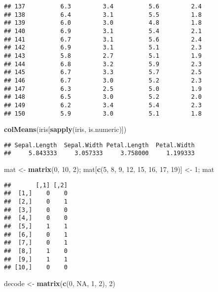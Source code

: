 \documentclass[]{article}
\newenvironment{Shaded}{\begin{snugshade}}{\end{snugshade}}
\newcommand{\DecValTok}[1]{\textcolor[rgb]{0.00,0.00,0.81}{#1}}
\newcommand{\KeywordTok}[1]{\textcolor[rgb]{0.13,0.29,0.53}{\textbf{#1}}}
\newcommand{\NormalTok}[1]{#1}
\newcommand{\OtherTok}[1]{\textcolor[rgb]{0.56,0.35,0.01}{#1}}
\newcommand{\StringTok}[1]{\textcolor[rgb]{0.31,0.60,0.02}{#1}}
\begin{document}
\begin{verbatim}
## 137          6.3         3.4          5.6         2.4
## 138          6.4         3.1          5.5         1.8
## 139          6.0         3.0          4.8         1.8
## 140          6.9         3.1          5.4         2.1
## 141          6.7         3.1          5.6         2.4
## 142          6.9         3.1          5.1         2.3
## 143          5.8         2.7          5.1         1.9
## 144          6.8         3.2          5.9         2.3
## 145          6.7         3.3          5.7         2.5
## 146          6.7         3.0          5.2         2.3
## 147          6.3         2.5          5.0         1.9
## 148          6.5         3.0          5.2         2.0
## 149          6.2         3.4          5.4         2.3
## 150          5.9         3.0          5.1         1.8
\end{verbatim}

\begin{Shaded}
\begin{Highlighting}[]
\KeywordTok{colMeans}\NormalTok{(iris[}\KeywordTok{sapply}\NormalTok{(iris, is.numeric)])}
\end{Highlighting}
\end{Shaded}

\begin{verbatim}
## Sepal.Length  Sepal.Width Petal.Length  Petal.Width 
##     5.843333     3.057333     3.758000     1.199333
\end{verbatim}

\begin{Shaded}
\begin{Highlighting}[]
\NormalTok{mat <-}\StringTok{ }\KeywordTok{matrix}\NormalTok{(}\DecValTok{0}\NormalTok{, }\DecValTok{10}\NormalTok{, }\DecValTok{2}\NormalTok{); mat[}\KeywordTok{c}\NormalTok{(}\DecValTok{5}\NormalTok{, }\DecValTok{8}\NormalTok{, }\DecValTok{9}\NormalTok{, }\DecValTok{12}\NormalTok{, }\DecValTok{15}\NormalTok{, }\DecValTok{16}\NormalTok{, }\DecValTok{17}\NormalTok{, }\DecValTok{19}\NormalTok{)] <-}\StringTok{ }\DecValTok{1}\NormalTok{; mat}
\end{Highlighting}
\end{Shaded}

\begin{verbatim}
##       [,1] [,2]
##  [1,]    0    0
##  [2,]    0    1
##  [3,]    0    0
##  [4,]    0    0
##  [5,]    1    1
##  [6,]    0    1
##  [7,]    0    1
##  [8,]    1    0
##  [9,]    1    1
## [10,]    0    0
\end{verbatim}

\begin{Shaded}
\begin{Highlighting}[]
\NormalTok{decode <-}\StringTok{ }\KeywordTok{matrix}\NormalTok{(}\KeywordTok{c}\NormalTok{(}\DecValTok{0}\NormalTok{, }\OtherTok{NA}\NormalTok{, }\DecValTok{1}\NormalTok{, }\DecValTok{2}\NormalTok{), }\DecValTok{2}\NormalTok{)}
\end{Highlighting}
\end{Shaded}
\end{document}
